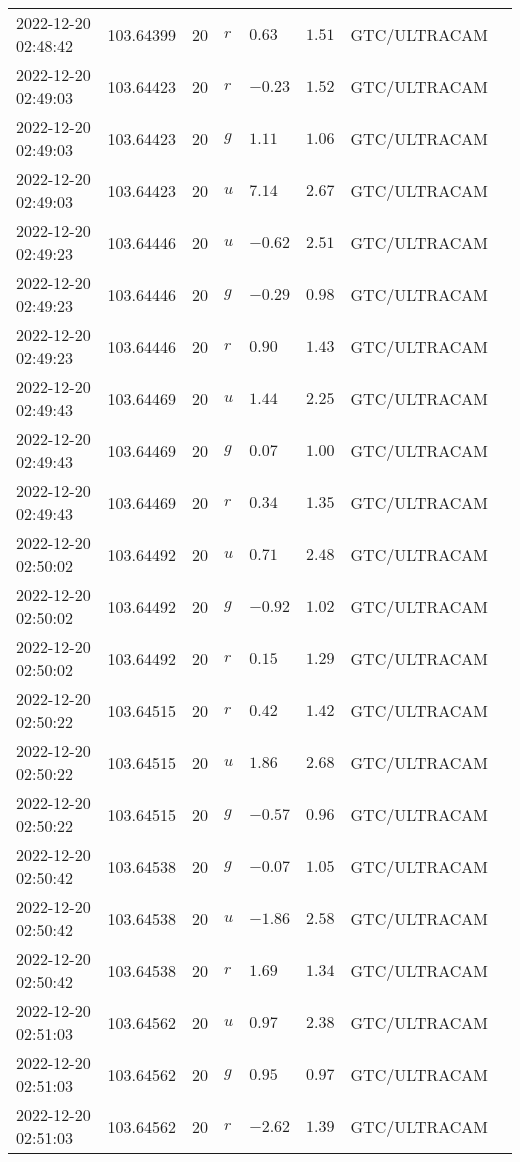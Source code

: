 \documentclass{nature_plusfigure}
\begin{document}
\begin{supplement}
\begin{center}
\begin{longtable}{llllllll}
2022-12-20 02:48:42 & 103.64399 & 20 & $r$ & $0.63$ & $1.51$ & GTC/ULTRACAM &  \\ 
2022-12-20 02:49:03 & 103.64423 & 20 & $r$ & $-0.23$ & $1.52$ & GTC/ULTRACAM &  \\ 
2022-12-20 02:49:03 & 103.64423 & 20 & $g$ & $1.11$ & $1.06$ & GTC/ULTRACAM &  \\ 
2022-12-20 02:49:03 & 103.64423 & 20 & $u$ & $7.14$ & $2.67$ & GTC/ULTRACAM &  \\ 
2022-12-20 02:49:23 & 103.64446 & 20 & $u$ & $-0.62$ & $2.51$ & GTC/ULTRACAM &  \\ 
2022-12-20 02:49:23 & 103.64446 & 20 & $g$ & $-0.29$ & $0.98$ & GTC/ULTRACAM &  \\ 
2022-12-20 02:49:23 & 103.64446 & 20 & $r$ & $0.90$ & $1.43$ & GTC/ULTRACAM &  \\ 
2022-12-20 02:49:43 & 103.64469 & 20 & $u$ & $1.44$ & $2.25$ & GTC/ULTRACAM &  \\ 
2022-12-20 02:49:43 & 103.64469 & 20 & $g$ & $0.07$ & $1.00$ & GTC/ULTRACAM &  \\ 
2022-12-20 02:49:43 & 103.64469 & 20 & $r$ & $0.34$ & $1.35$ & GTC/ULTRACAM &  \\ 
2022-12-20 02:50:02 & 103.64492 & 20 & $u$ & $0.71$ & $2.48$ & GTC/ULTRACAM &  \\ 
2022-12-20 02:50:02 & 103.64492 & 20 & $g$ & $-0.92$ & $1.02$ & GTC/ULTRACAM &  \\ 
2022-12-20 02:50:02 & 103.64492 & 20 & $r$ & $0.15$ & $1.29$ & GTC/ULTRACAM &  \\ 
2022-12-20 02:50:22 & 103.64515 & 20 & $r$ & $0.42$ & $1.42$ & GTC/ULTRACAM &  \\ 
2022-12-20 02:50:22 & 103.64515 & 20 & $u$ & $1.86$ & $2.68$ & GTC/ULTRACAM &  \\ 
2022-12-20 02:50:22 & 103.64515 & 20 & $g$ & $-0.57$ & $0.96$ & GTC/ULTRACAM &  \\ 
2022-12-20 02:50:42 & 103.64538 & 20 & $g$ & $-0.07$ & $1.05$ & GTC/ULTRACAM &  \\ 
2022-12-20 02:50:42 & 103.64538 & 20 & $u$ & $-1.86$ & $2.58$ & GTC/ULTRACAM &  \\ 
2022-12-20 02:50:42 & 103.64538 & 20 & $r$ & $1.69$ & $1.34$ & GTC/ULTRACAM &  \\ 
2022-12-20 02:51:03 & 103.64562 & 20 & $u$ & $0.97$ & $2.38$ & GTC/ULTRACAM &  \\ 
2022-12-20 02:51:03 & 103.64562 & 20 & $g$ & $0.95$ & $0.97$ & GTC/ULTRACAM &  \\ 
2022-12-20 02:51:03 & 103.64562 & 20 & $r$ & $-2.62$ & $1.39$ & GTC/ULTRACAM &  \\ 

\end{longtable}
\end{center}
\end{supplement}
\end{document}
